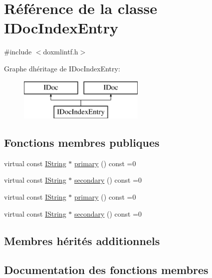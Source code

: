 \hypertarget{class_i_doc_index_entry}{}\section{Référence de la classe I\+Doc\+Index\+Entry}
\label{class_i_doc_index_entry}


{\ttfamily \#include $<$doxmlintf.\+h$>$}

Graphe d\textquotesingle{}héritage de I\+Doc\+Index\+Entry\+:\begin{figure}[H]
\begin{center}
\leavevmode
\includegraphics[height=2.000000cm]{class_i_doc_index_entry}
\end{center}
\end{figure}
\subsection*{Fonctions membres publiques}
\begin{DoxyCompactItemize}
\item 
virtual const \hyperlink{class_i_string}{I\+String} $\ast$ \hyperlink{class_i_doc_index_entry_a0f255327035cf01710439617d35fd5c1}{primary} () const  =0
\item 
virtual const \hyperlink{class_i_string}{I\+String} $\ast$ \hyperlink{class_i_doc_index_entry_a86ade8aa3973b29db7f557b5e828c17c}{secondary} () const  =0
\item 
virtual const \hyperlink{class_i_string}{I\+String} $\ast$ \hyperlink{class_i_doc_index_entry_a0f255327035cf01710439617d35fd5c1}{primary} () const  =0
\item 
virtual const \hyperlink{class_i_string}{I\+String} $\ast$ \hyperlink{class_i_doc_index_entry_a86ade8aa3973b29db7f557b5e828c17c}{secondary} () const  =0
\end{DoxyCompactItemize}
\subsection*{Membres hérités additionnels}


\subsection{Documentation des fonctions membres}
\hypertarget{class_i_doc_index_entry_a0f255327035cf01710439617d35fd5c1}{}
